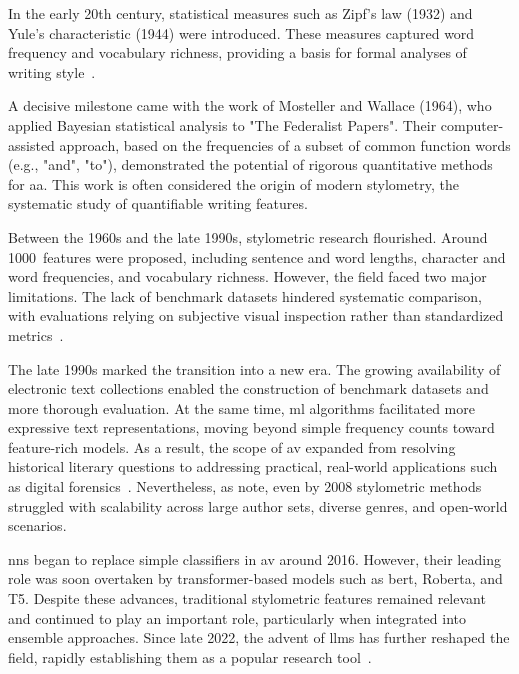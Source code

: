 
In the early 20th century, statistical measures such as Zipf's law (1932) and Yule's characteristic (1944) were introduced. 
These measures captured word frequency and vocabulary richness, providing a basis for formal analyses of writing style~\citep{neal_surveying_2018,stamatatos_survey_2009}.

A decisive milestone came with the work of Mosteller and Wallace (1964), who applied Bayesian statistical analysis to "The Federalist Papers".
Their computer-assisted approach, based on the frequencies of a subset of common function words (e.g., "and", "to"), demonstrated the potential of rigorous quantitative methods for \ac{aa}. 
This work is often considered the origin of modern stylometry, the systematic study of quantifiable writing features.

Between the 1960s and the late 1990s, stylometric research flourished.
Around \num{1000}~features were proposed, including sentence and word lengths, character and word frequencies, and vocabulary richness. 
However, the field faced two major limitations. 
The lack of benchmark datasets hindered systematic comparison, with evaluations relying on subjective visual inspection rather than standardized metrics~\citep{stamatatos_survey_2009}.

The late 1990s marked the transition into a new era. 
The growing availability of electronic text collections enabled the construction of benchmark datasets and more thorough evaluation. 
At the same time, \ac{ml} algorithms facilitated more expressive text representations, moving beyond simple frequency counts toward feature-rich models. 
As a result, the scope of \ac{av} expanded from resolving historical literary questions to addressing practical, real-world applications such as digital forensics~\citep{stamatatos_survey_2009}. 
Nevertheless, as \citet{abbasi_writeprints_2008} note, even by 2008 stylometric methods struggled with scalability across large author sets, diverse genres, and open-world scenarios.

\acp{nn} began to replace simple classifiers in \ac{av} around 2016. 
However, their leading role was soon overtaken by transformer-based models such as \acs{bert}, Ro\acs{bert}a, and T5. 
Despite these advances, traditional stylometric features remained relevant and continued to play an important role, particularly when integrated into ensemble approaches. 
Since late 2022, the advent of \acp{llm} has further reshaped the field, rapidly establishing them as a popular research tool~\citep{schmidt_llm_av_latin_24}.
